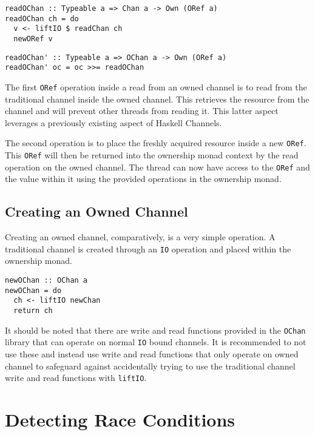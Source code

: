 \documentclass[onehalf,11pt]{beavtex}
\begin{document}
\begin{verbatim}
readOChan :: Typeable a => Chan a -> Own (ORef a)
readOChan ch = do
  v <- liftIO $ readChan ch
  newORef v
\end{verbatim}

\begin{verbatim}
readOChan' :: Typeable a => OChan a -> Own (ORef a)
readOChan' oc = oc >>= readOChan
\end{verbatim}

The first \texttt{ORef} operation inside a read from an owned channel
is to read from the traditional channel inside the owned channel. This
retrieves the resource from the channel and will prevent other threads from
reading it. This latter aspect leverages a previously existing aspect of
Haskell Channels. %

The second operation is to place the freshly acquired resource inside a new
\texttt{ORef}.  This \texttt{ORef} will then be returned into the
ownership monad context by the read operation on the
owned channel.  The thread can now have access to the \texttt{ORef}
and the value within it using the provided operations in the
ownership monad.


\subsection{Creating an Owned Channel}

Creating an owned channel, comparatively, is a very simple operation.
A traditional channel is created through an \texttt{IO} operation and placed
within the ownership monad.

\begin{verbatim}
newOChan :: OChan a
newOChan = do
  ch <- liftIO newChan
  return ch
\end{verbatim}

It should be noted that there are write and read functions provided
in the \texttt{OChan} library that can operate on normal \texttt{IO} bound
channels.  It is recommended to not use these and instead use write and read
functions that only operate on owned channel to safeguard against
accidentally trying to use the traditional channel write and read functions
with \texttt{liftIO}.

\section{Detecting Race Conditions}
\end{document}
